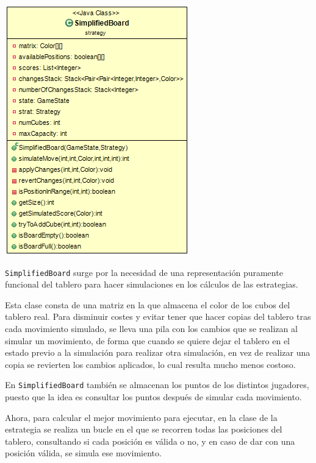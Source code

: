 \documentclass[12pt,a4paper,openright]{book}
\theoremstyle{break}
\begin{document}
\begin{center}
\includegraphics[scale=0.75]{SimplifiedBoard-sprint7.png} 
\end{center}

\texttt{SimplifiedBoard} surge por la necesidad de una representación puramente funcional del tablero para hacer simulaciones en los cálculos de las estrategias.

Esta clase consta de una matriz en la que almacena el color de los cubos del tablero real. Para disminuir costes y evitar tener que hacer copias del tablero tras cada movimiento simulado, se lleva una pila con los cambios que se realizan al simular un movimiento, de forma que cuando se quiere dejar el tablero en el estado previo a la simulación para realizar otra simulación, en vez de realizar una copia se revierten los cambios aplicados, lo cual resulta mucho menos costoso.

En \texttt{SimplifiedBoard} también se almacenan los puntos de los distintos jugadores, puesto que la idea es consultar los puntos después de simular cada movimiento.

Ahora, para calcular el mejor movimiento para ejecutar, en la clase de la estrategia se realiza un bucle en el que se recorren todas las posiciones del tablero, consultando si cada posición es válida o no, y en caso de dar con una posición válida, se simula ese movimiento.
\end{document}
